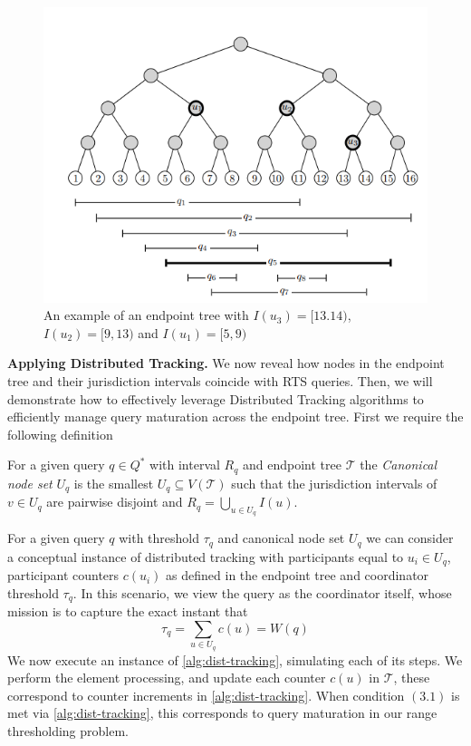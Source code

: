 \begin{center}
\begin{figure}[h]
\centering
\includegraphics[scale=0.7]{thesis/figures/endpoint_tree.png}
\caption{An example of an endpoint tree with $I(u_3) = [13. 14)$, $I(u_2) = [9, 13)$ and $I(u_1) = [5, 9)$}
\end{figure}
\end{center}

\textbf{Applying Distributed Tracking.} We now reveal how nodes in the endpoint tree and their jurisdiction intervals coincide with RTS queries. Then, we will demonstrate how to effectively leverage Distributed Tracking algorithms to efficiently manage query maturation across the endpoint tree. First we require the following definition

\begin{definition} For a given query $q\in Q^*$ with interval $R_q$ and endpoint tree $\mathcal{T}$ the \textit{Canonical node set} $U_q$ is the smallest $U_q\subseteq V(\mathcal{T})$ such that the jurisdiction intervals of $v\in U_q$ are pairwise disjoint and $R_q = \bigcup_{u\in U_q} I(u)$.
\end{definition}

For a given query $q$ with threshold $\tau_q$ and canonical node set $U_q$ we can consider a conceptual instance of distributed tracking with participants equal to $u_i\in U_q$, participant counters $c(u_i)$ as defined in the endpoint tree and coordinator threshold $\tau_q$. In this scenario, we view the query as the coordinator itself, whose mission is to capture the exact instant that 
\begin{equation}
    \tau_q = \sum_{u \in U_q} c(u) = W(q)
\end{equation}
We now execute an instance of \cref{alg:dist-tracking}, simulating each of its steps. We perform the element processing, and update each counter $c(u)$ in $\mathcal{T}$, these correspond to counter increments in \cref{alg:dist-tracking}. When condition $(3.1)$ is met via \cref{alg:dist-tracking}, this corresponds to query maturation in our range thresholding problem. 


